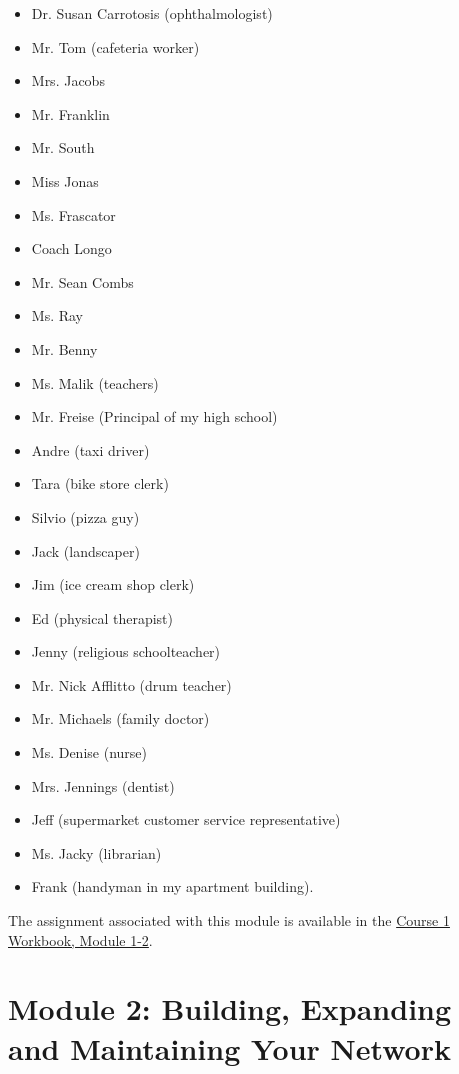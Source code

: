 \begin{multicols}{2}
	\begin{itemize}[leftmargin=1.0cm]
		\item Dr. Susan Carrotosis \break(ophthalmologist)
		\item Mr. Tom \break(cafeteria worker)
		\item Mrs. Jacobs
		\item Mr. Franklin
		\item Mr. South
		\item Miss Jonas
		\item Ms. Frascator
		\item Coach Longo
		\item Mr. Sean Combs
		\item Ms. Ray
		\item Mr. Benny
		\item Ms. Malik \break(teachers)
		\item Mr. Freise \break(Principal of my high school)
		\item Andre \break(taxi driver)
		\item Tara \break(bike store clerk)
		\item Silvio \break(pizza guy)
		\item Jack \break(landscaper)
		\item Jim \break(ice cream shop clerk)
		\item Ed \break(physical therapist)
		\item Jenny \break(religious schoolteacher)
		\item Mr. Nick Afflitto \break(drum teacher)
		\item Mr. Michaels \break(family doctor)
		\item Ms. Denise \break(nurse)
		\item Mrs. Jennings \break(dentist)
		\item Jeff \break(supermarket customer service representative)
		\item Ms. Jacky \break(librarian)
		\item Frank  \break(handyman in my apartment building).
	\end{itemize}
\end{multicols}

The assignment associated with this module is available in the \href{#course1workbook}{Course 1 Workbook, Module 1-2}.

\pagebreak \section*{Module 2: Building, Expanding and Maintaining Your Network}
\noindent\makebox[\textwidth]{\rule{\linewidth}{0.4pt}} 
\localtableofcontents
\noindent\makebox[\textwidth]{\rule{\linewidth}{0.4pt}}


